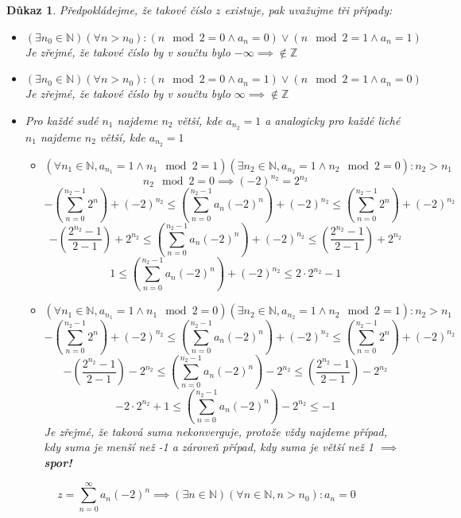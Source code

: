 \documentclass[12pt]{book}
\newtheorem{dukaz}{Důkaz}
\begin{document}
\begin{dukaz}
	Předpokládejme, že takové číslo $z$ existuje, pak uvažujme tři případy:
	\begin{itemize}
		\item[$a)$] $(\exists n_0 \in \mathbb{N})(\forall n > n_0): (n\mod2 = 0 \land a_n = 0)\lor (n\mod2 = 1 \land a_n = 1)$
		Je zřejmé, že takové číslo by v součtu bylo $-\infty \implies \notin \mathbb{Z}$
		\item[$b)$] $(\exists n_0 \in \mathbb{N})(\forall n > n_0): (n\mod2 = 0 \land a_n = 1)\lor (n\mod2 = 1 \land a_n = 0)$
		Je zřejmé, že takové číslo by v součtu bylo $\infty \implies \notin \mathbb{Z}$
		\item[$c)$] Pro každé sudé $n_1$ najdeme $n_2$ větší, kde $a_{n_2}=1$ a analogicky pro každé liché $n_1$ najdeme $n_2$ větší, kde $a_{n_2}=1$
		\begin{itemize}
		\item[I.]$(\forall n_1 \in \mathbb{N},a_{n_1} = 1\land n_1\mod2=1)(\exists n_2 \in \mathbb{N},a_{n_2} = 1\land n_2\mod2=0):n_2 > n_1$\newline
		$$ n_2\mod 2 = 0 \implies (-2)^{n_2} = 2^{n_2}$$
		$$-\left(\sum_{n=0}^{n_2-1}2^n\right)+(-2)^{n_2}\leq \left(\sum_{n=0}^{n_2-1}a_n(-2)^n\right)+(-2)^{n_2}  \leq\left(\sum_{n=0}^{n_2-1}2^n\right)+(-2)^{n_2}$$
		$$-\left(\frac{2^{n_2}-1}{2-1}\right)+2^{n_2}\leq   \left( \sum_{n=0}^{n_2-1}a_n(-2)^n \right)+(-2)^{n_2}  \leq\left(\frac{2^{n_2}-1}{2-1} \right)+2^{n_2}$$
		$$1\leq   \left( \sum_{n=0}^{n_2-1}a_n(-2)^n \right)+(-2)^{n_2}  \leq 2\cdot2^{n_2}-1$$
		\item[II.]$(\forall n_1 \in \mathbb{N},a_{n_1} = 1\land n_1\mod2=0)(\exists n_2 \in \mathbb{N},a_{n_2} = 1\land n_2\mod2=1):n_2 > n_1$\newline
		$$-\left(\sum_{n=0}^{n_2-1}2^n\right)+(-2)^{n_2}\leq \left(\sum_{n=0}^{n_2-1}a_n(-2)^n\right)+(-2)^{n_2}  \leq\left(\sum_{n=0}^{n_2-1}2^n\right)+(-2)^{n_2}$$
		$$-\left(\frac{2^{n_2}-1}{2-1}\right)-2^{n_2}\leq   \left( \sum_{n=0}^{n_2-1}a_n(-2)^n \right)-2^{n_2}  \leq\left(\frac{2^{n_2}-1}{2-1} \right)-2^{n_2}$$
		$$-2\cdot2^{n_2}+1\leq   \left( \sum_{n=0}^{n_2-1}a_n(-2)^n \right)-2^{n_2}  \leq -1$$
		Je zřejmé, že taková suma nekonverguje, protože vždy najdeme případ, kdy suma je menší než -1 a zároveň případ, kdy suma je větší než 1 $\implies$ \textbf{spor!}
		\end{itemize}
		
	\end{itemize}
	$$ z = \sum_{n=0}^\infty a_n(-2)^n \implies (\exists n \in \mathbb{N})(\forall n \in \mathbb{N},n>n_0):a_n=0$$
	\end{dukaz}
\end{document}
